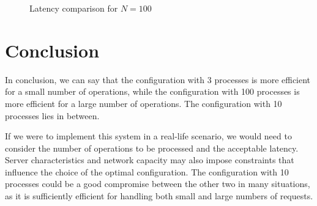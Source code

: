 \documentclass{article}
\begin{document}
\begin{figure}[ht!]
    \centering
    \caption{Latency comparison for \( N = 100 \)}
\end{figure}

\section{Conclusion}
In conclusion, we can say that the configuration with 3 processes is more
efficient for a small number of operations, while the configuration with 100
processes is more efficient for a large number of operations. The configuration
with 10 processes lies in between.

If we were to implement this system in a real-life scenario, we would need to
consider the number of operations to be processed and the acceptable latency.
Server characteristics and network capacity may also impose constraints that
influence the choice of the optimal configuration. The configuration with 10
processes could be a good compromise between the other two in many situations,
as it is sufficiently efficient for handling both small and large numbers of requests.
\end{document}
